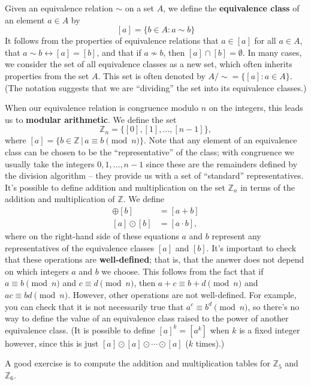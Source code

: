 \documentclass[letterpaper,12pt]{article}
\newcommand{\Z}{\mathbb{Z}}
\begin{document}
Given an equivalence relation $\sim$ on a set $A$, we define the {\bf equivalence class} of an element $a\in A$ by
\[
 [a] = \{b\in A : a\sim b\}
\]
It follows from the properties of equivalence relations that $a\in [a]$ for all $a\in A$, that $a\sim b \leftrightarrow [a]=[b]$, and that if $a\not\sim b$, then $[a]\cap [b] =\emptyset$. In many cases, we consider the set of all equivalence classes as a new set, which often inherits properties from the set $A$. This set is often denoted by $A/\sim = \{[a] : a\in A\}$. (The notation suggests that we are ``dividing'' the set into its equivalence classes.)

When our equivalence relation is congruence modulo $n$ on the integers, this leads us to {\bf modular arithmetic}. We define the set
\[
 \Z_n = \{[0],[1],\ldots, [n-1]\},
\]
where $[a] = \{b\in \Z \,|\, a\equiv b \pmod{n}\}$. Note that any element of an equivalence class can be chosen to be the ``representative'' of the class; with congruence we usually take the integers $0,1,\ldots, n-1$ since these are the remainders defined by the division algorithm -- they provide us with a set of ``standard'' representatives. It's possible to define addition and multiplication on the set $\Z_n$ in terms of the addition and multiplication of $\Z$. We define
\begin{align*}
 [a]\oplus [b] & = [a+b]\\
 [a]\odot [b] & = [a\cdot b],
\end{align*}
where on the right-hand side of these equations $a$ and $b$ represent any representatives of the equivalence classes $[a]$ and $[b]$. It's important to check that these operations are {\bf well-defined}; that is, that the answer does not depend on which integers $a$ and $b$ we choose. This follows from the fact that if $a\equiv b\pmod{n}$ and $c\equiv d\pmod{n}$, then $a+c \equiv b+d\pmod{n}$ and $ac\equiv bd\pmod{n}$. However, other operations are not well-defined. For example, you can check that it is not necessarily true that $a^c\equiv b^d\pmod{n}$, so there's no way to define the value of an equivalence class raised to the power of another equivalence class. (It is possible to define $[a]^k = [a^k]$ when $k$ is a fixed integer however, since this is just $[a]\odot [a]\odot\cdots\odot [a]$ ($k$ times).)

A good exercise is to compute the addition and multiplication tables for $\Z_5$ and $\Z_6$.
\end{document}
